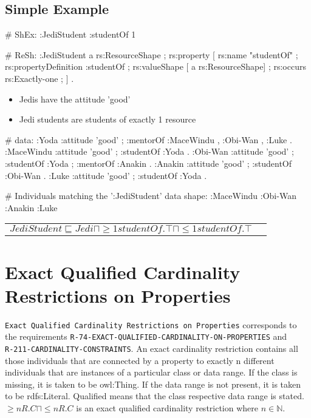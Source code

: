 \documentclass{llncs}
\newcommand{\ms}[1]{\texttt{#1}}
\newenvironment{DL}{
  \vspace{0cm}
	\begin{center}
  \begin{tabular}{r l}

}{
  \end{tabular}
	\end{center}
}
\newcommand{\tb}[1]{\todo[size=\small, color=blue!40]{\textbf{Thomas:} #1}}
\begin{document}
\subsection{Simple Example}


\begin{ex}
# ShEx:
:JediStudent {
    :studentOf {}{1} }
\end{ex}

\begin{ex}
# ReSh:
:JediStudent a rs:ResourceShape ;
    rs:property [
        rs:name "studentOf" ;
        rs:propertyDefinition :studentOf ;
        rs:valueShape [ a rs:ResourceShape] ;
        rs:occurs rs:Exactly-one ; ] .
\end{ex}

\begin{itemize}
	\item Jedis have the attitude 'good'
	\item Jedi students are students of exactly 1 resource
\end{itemize}

\begin{ex}
# data:
:Yoda 
    :attitude 'good' ;
    :mentorOf :MaceWindu , :Obi-Wan , :Luke .
:MaceWindu
    :attitude 'good' ;
    :studentOf :Yoda .
:Obi-Wan 
    :attitude 'good' ;
    :studentOf :Yoda ;
    :mentorOf :Anakin .
:Anakin
    :attitude 'good' ; 
    :studentOf :Obi-Wan .
:Luke
    :attitude 'good' ;
    :studentOf :Yoda .
\end{ex}

\begin{ex}
# Individuals matching the ’:JediStudent’ data shape:
:MaceWindu :Obi-Wan :Anakin :Luke
\end{ex}

\begin{DL}
$JediStudent \sqsubseteq Jedi \sqcap \geq1 studentOf.\top \sqcap \leq1 studentOf.\top$ \\
\end{DL}

\section{Exact Qualified Cardinality Restrictions on Properties}

\ms{Exact Qualified Cardinality Restrictions on Properties} corresponds to the requirements
\ms{R-74-EXACT-QUALIFIED-CARDINALITY-ON-PROPERTIES} and \\
\ms{R-211-CARDINALITY-CONSTRAINTS}.
An exact cardinality restriction contains all those individuals that are connected by a property to exactly n different individuals that are instances of a particular class or data range. 
If the class is missing, it is taken to be owl:Thing. 
If the data range is not present, it is taken to be rdfs:Literal.
Qualified means that the class respective data range is stated. 
$\geq n R. C \sqcap \leq n R. C $ is an exact qualified cardinality restriction where $n \in \mathbb{N}$.
\end{document}
